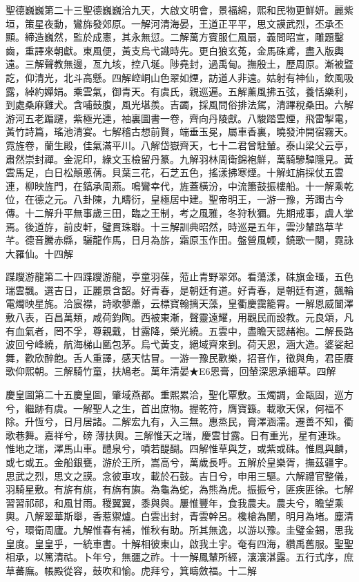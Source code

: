 \begin{pinyinscope}
聖德巍巍第二十三聖德巍巍洽九天，大啟文明會，景福綿，熙和民物更鮮妍。麗紫垣，策星夜動，鸞旆發郊原。一解河清海晏，王道正平平，思文謨武烈，丕承丕顯。締造巍然，監於成憲，其永無愆。二解萬方賓服仁風扇，義問昭宣，雕題鑿齒，重譯來朝獻。東風便，黃支烏弋識時先。更白狼玄菟，金馬硃鳶，盡入版輿遠。三解聲教無邊，亙九垓，控八埏。陟堯封，過禹甸。撫殷土，歷周原。漸被暨訖，仰清光，北斗高懸。四解崆峒山色翠如煙，訪道人非遠。姑射有神仙，飲風吸露，綽約嬋娟。乘雲氣，御青天。有虞氏，親巡遍。五解薰風拂五弦，養恬樂利，到處桑麻雞犬。含哺鼓腹，風光堪羨。吉蠲，採風問俗排法駕，清蹕稅桑田。六解游河五老蹁躚，紫極光連，袖裏圖書一卷，齊向丹陵獻。八駿踏雲煙，飛雷掣電，黃竹詩篇，瑤池清宴。七解稽古想前賢，端垂玉冕，屬車香裏，曉發沖開宿霧天。霓旌卷，蘭生殿，佳氣滿平川。八解岱嶽齊天，七十二君曾駐輦。泰山梁父云亭，肅然崇封禪。金泥印，綠文玉檢留丹篆。九解羽林周衛錦袍鮮，萬騎驂驔隱見。黃雲馬足，白日松顛蔥蒨。貝葉三花，石芝五色，搖漾拂寒煙。十解虹旃採仗五雲連，柳映旌門，在鎬承周燕。鳴鸞幸代，旌蓋橫汾，中流簫鼓振樓船。十一解乘乾位，在德之元。八卦陳，九疇衍，皇極居中建。聖帝明王，一游一豫，芳躅古今傳。十二解升平無事歲三田，臨之王制，考之風雅，冬狩秋獮。先期戒事，虞人掌焉。後道斿，前皮軒，璧貫珠聯。十三解訓典昭然，時巡是五年，雲沙輦路草芊芊。德音騰赤縣，驪龍作馬，日月為旂，霜原玉作田。盤營風輭，鐃歌一闋，霓詠大羅仙。十四解

蹀躞游龍第二十四蹀躞游龍，亭童羽葆，蒞止青野翠郊。看蕩漾，硃旗金瑵，五色瑞雲飄。選吉日，正麗景含韶。好青春，是朝廷有道。好青春，是朝廷有道，飆輪電燭映星旄。洽宸襟，詩歌蓼蕭，云標寶翰摛天藻，皇衢慶靄籠霄。一解恩威闓澤敷八表，百昌萬類，咸荷鈞陶。西被東漸，聲靈遠耀，用觀民而設教。元良頌，凡有血氣者，罔不孚，尊親戴，甘露降，榮光繞。五雲中，盡瞻天認赭袍。二解長路波回兮峰繞，航海梯山匭包茅。烏弋黃支，絕域齊來到。荷天恩，涵大造。婆娑起舞，歡欣醉飽。舌人重譯，感天怙冒。一游一豫民歡樂，招音作，徵與角，君臣賡歌仰熙朝。三解騎竹童，扶鳩老。萬年清晏★E6恩膏，回輦深恩承細草。四解

慶皇圖第二十五慶皇圖，肇域燕都。重熙累洽，聖化覃敷。玉燭調，金甌固，巡方兮，繼跡有虞。一解聖人之生，首出庶物。握乾符，膺寶籙。載歌天保，何福不除。升恆兮，日月居諸。二解宏九有，入三無。惠烝民，膏澤涵濡。遷善不知，衢歌巷舞。嘉祥兮，磅薄扶輿。三解惟天之瑞，慶雲甘露。日有重光，星有連珠。惟地之瑞，澤馬山車。醴泉兮，噴若醍醐。四解惟草與芝，或紫或硃。惟鳳與麟，或七或五。金船銀甕，游於王所，嵩高兮，萬歲長呼。五解於皇樂胥，撫茲疆宇。思武之烈，思文之謨。念彼車攻，載於石鼓。吉日兮，申用三驅。六解禮官整儀，羽騎星敷。有旂有旐，有旃有旟。為龜為蛇，為熊為虎。振振兮，匪疾匪徐。七解習習祁祁，和風甘雨。稷翼翼，黍與與。屢惟豐年，食我農夫。農夫兮，瞻望乘輿。八解翠華斯舉，香惹禦爐。白雲出封，青雲幹呂。欃槍為闉，明月為堵。塵清兮，環衛周廬。九解惟春有補，惟秋有助。所其無逸，以游以豫。圭璧金錫，思我皇度。皇皇乎，一統車書。十解相彼東山，啟我土宇。奄有四海，纘禹舊服。聖聖相承，以篤清祜。卜年兮，無疆之祚。十一解鳳輦所經，瀼瀼湛露。五行式序，庶草蕃廡。帳殿從容，鼓吹和愉。虎拜兮，箕疇斂福。十二解


\end{pinyinscope}
